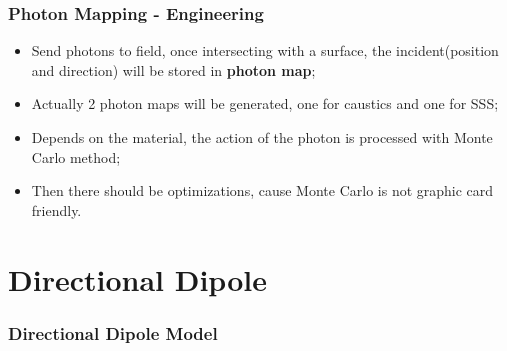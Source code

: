 \begin{frame}
  \frametitle{Photon Mapping - Engineering}
  \begin{itemize}
  \item Send photons to field, once intersecting with a surface, the
    incident(position and direction) will be stored in {\bf photon map};
  \item Actually 2 photon maps will be generated, one for caustics and
    one for SSS;
  \item Depends on the material, the action of the photon is processed
    with Monte Carlo method;
\item Then there should be optimizations, cause Monte Carlo is not
  graphic card friendly.
  \end{itemize}
\end{frame}




\section{Directional Dipole}

\begin{frame}
  \frametitle{Directional Dipole Model}
\end{frame}

